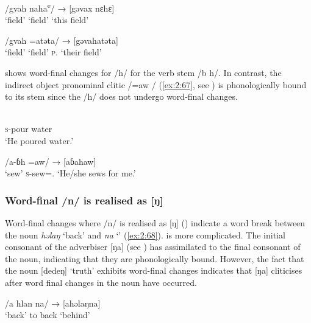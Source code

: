 \ea \label{ex:2:64}
\gll       {[gəvax]}  {\ExampleSpace}   {/gvah}     {naha\textsuperscript{e}/}  {→}  {[gəvax nɛhɛ]}\\
       {‘field’}   {}  {‘field’}    {\DEM}    { }        {‘this field’}\\
\z

\ea \label{ex:2:65}
\gll [gəvax]  {\ExampleSpace}  /gvah     =atəta/  →  [gəvahatəta]\\
     ‘field’    {}  ‘field’  \textsc{p}.{\POSS} {} {‘their field’}    \\
\z

 shows word-final changes for /h/ for the verb stem /b h/. In contrast, the {\oneS} indirect object pronominal clitic /=aw / (\ref{ex:2:67}, see ) is phonologically bound to its stem since the /h/ does not undergo word-final changes.

\ea \label{ex:2:66}
\\
      \textsc{s}-pour  water\\
\glt  ‘He poured water.'
\z

\ea \label{ex:2:67}
\gll [ɓax] {\ExampleSpace} {/a-ɓh =aw/}  {→}  [aɓahaw]\\
     ‘sew’  {}  \textsc{s}-sew={\oneS}.{\IO}  {}   {‘He/she sews for me.’}\\
\z

\subsubsection{Word-final /n/ is realised as [ŋ]}\label{sec:2.6.1.2}

Word-final changes where /n/ is realised as [ŋ] (\citealt{Bow1997c}) indicate a word break between the noun \textit{həlaŋ} ‘back’ and \textit{na} ‘\PSP' (\ref{ex:2:68}).  is more complicated. The initial consonant of the adverbiser [ŋa] (see ) has assimilated to the final consonant of the noun, indicating that they are phonologically bound. However, the fact that the noun [dedeŋ] ‘truth’ exhibits  word-final changes indicates that [ŋa] cliticises after word final changes in the noun have occurred. 

\ea \label{ex:2:68}
\gll [həlaŋ]  {\ExampleSpace}  /a  hlan     na/ \hspace{8pt} →\hspace{5pt} [ahəlaŋna]\\
      ‘back’  {}   to  back    {\PSP} {}  {}   ‘behind’ \\
\z

